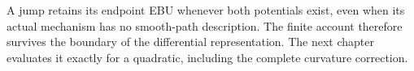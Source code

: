 A jump retains its endpoint EBU whenever both potentials exist, even when its actual mechanism has no smooth-path description. The finite account therefore survives the boundary of the differential representation. The next chapter evaluates it exactly for a quadratic, including the complete curvature correction.
